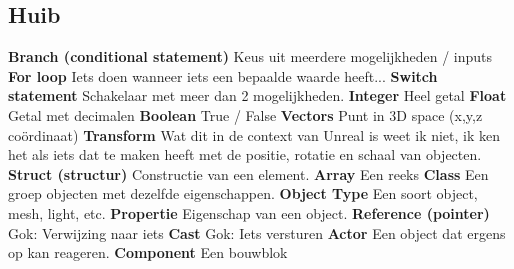 \subsection*{Huib}
\textbf{Branch (conditional statement)} \newline
Keus uit meerdere mogelijkheden / inputs \newline
\textbf{For loop} \newline
Iets doen wanneer iets een bepaalde waarde heeft... \newline
\textbf{Switch statement} \newline
Schakelaar met meer dan 2 mogelijkheden. \newline
\textbf{Integer} \newline
Heel getal \newline
\textbf{Float} \newline
Getal met decimalen \newline
\textbf{Boolean} \newline
True / False \newline
\textbf{Vectors} \newline
Punt in 3D space (x,y,z coördinaat) \newline
\textbf{Transform} \newline
Wat dit in de context van Unreal is weet ik niet, ik ken het als iets dat te maken heeft met de positie, rotatie en schaal van objecten. \newline
\textbf{Struct (structur)} \newline
Constructie van een element. \newline
\textbf{Array} \newline
Een reeks \newline
\textbf{Class} \newline
Een groep objecten met dezelfde eigenschappen. \newline
\textbf{Object Type} \newline
Een soort object, mesh, light, etc. \newline
\textbf{Propertie} \newline
Eigenschap van een object. \newline
\textbf{Reference (pointer)} \newline
Gok: Verwijzing naar iets \newline
\textbf{Cast} \newline
Gok: Iets versturen \newline
\textbf{Actor} \newline
Een object dat ergens op kan reageren. \newline
\textbf{Component} \newline
Een bouwblok